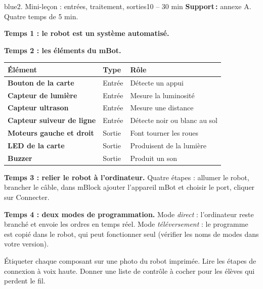 \documentclass[11pt,a4paper]{article}
\begin{document}
\begin{etape}{blue}{2. Mini-leçon : entrées, traitement, sorties}{10 -- 30 min}
\textbf{Support\,:} annexe A. Quatre temps de 5 min.

\textbf{Temps 1 : le robot est un système automatisé.}
\begin{center}
\end{center}

\textbf{Temps 2 : les éléments du mBot.}
\begin{center}
\begin{tabularx}{\linewidth}{>{\bfseries}p{3.4cm}Y Y}
\toprule
Élément & Type & Rôle\\
\midrule
Bouton de la carte & Entrée & Détecte un appui\\
Capteur de lumière & Entrée & Mesure la luminosité\\
Capteur ultrason & Entrée & Mesure une distance\\
Capteur suiveur de ligne & Entrée & Détecte noir ou blanc au sol\\
Moteurs gauche et droit & Sortie & Font tourner les roues\\
LED de la carte & Sortie & Produisent de la lumière\\
Buzzer & Sortie & Produit un son\\
\bottomrule
\end{tabularx}
\end{center}

\textbf{Temps 3 : relier le robot à l'ordinateur.} Quatre étapes : allumer le robot, brancher le câble, dans mBlock ajouter l'appareil mBot et choisir le port, cliquer sur Connecter.

\textbf{Temps 4 : deux modes de programmation.} Mode \emph{direct} : l'ordinateur reste branché et envoie les ordres en temps réel. Mode \emph{téléversement} : le programme est copié dans le robot, qui peut fonctionner seul (vérifier les noms de modes dans votre version).

\begin{astuce}
Étiqueter chaque composant sur une photo du robot imprimée. Lire les étapes de connexion à voix haute. Donner une liste de contrôle à cocher pour les élèves qui perdent le fil.
\end{astuce}
\end{etape}
\end{document}
